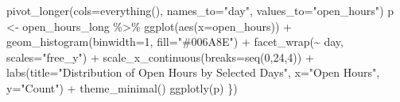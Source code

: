 \documentclass[
  12pt,
  letterpaper,
  DIV=11,
  numbers=noendperiod]{scrartcl}
\newenvironment{Shaded}{\begin{snugshade}}{\end{snugshade}}
\newcommand{\AttributeTok}[1]{\textcolor[rgb]{0.98,0.46,0.51}{#1}}
\newcommand{\DecValTok}[1]{\textcolor[rgb]{0.47,0.72,1.00}{#1}}
\newcommand{\FunctionTok}[1]{\textcolor[rgb]{0.70,0.57,0.94}{#1}}
\newcommand{\NormalTok}[1]{\textcolor[rgb]{0.88,0.89,0.91}{#1}}
\newcommand{\OtherTok}[1]{\textcolor[rgb]{0.70,0.57,0.94}{#1}}
\newcommand{\SpecialCharTok}[1]{\textcolor[rgb]{0.47,0.72,1.00}{#1}}
\newcommand{\StringTok}[1]{\textcolor[rgb]{0.62,0.80,1.00}{#1}}
\begin{document}
\begin{Shaded}
\begin{Highlighting}[]
      \FunctionTok{pivot\_longer}\NormalTok{(}\AttributeTok{cols=}\FunctionTok{everything}\NormalTok{(), }\AttributeTok{names\_to=}\StringTok{"day"}\NormalTok{, }\AttributeTok{values\_to=}\StringTok{"open\_hours"}\NormalTok{)}
\NormalTok{    p }\OtherTok{\textless{}{-}}\NormalTok{ open\_hours\_long }\SpecialCharTok{\%\textgreater{}\%}
      \FunctionTok{ggplot}\NormalTok{(}\FunctionTok{aes}\NormalTok{(}\AttributeTok{x=}\NormalTok{open\_hours)) }\SpecialCharTok{+}
      \FunctionTok{geom\_histogram}\NormalTok{(}\AttributeTok{binwidth=}\DecValTok{1}\NormalTok{, }\AttributeTok{fill=}\StringTok{"\#006A8E"}\NormalTok{) }\SpecialCharTok{+}
      \FunctionTok{facet\_wrap}\NormalTok{(}\SpecialCharTok{\textasciitilde{}}\NormalTok{ day, }\AttributeTok{scales=}\StringTok{"free\_y"}\NormalTok{) }\SpecialCharTok{+}
      \FunctionTok{scale\_x\_continuous}\NormalTok{(}\AttributeTok{breaks=}\FunctionTok{seq}\NormalTok{(}\DecValTok{0}\NormalTok{,}\DecValTok{24}\NormalTok{,}\DecValTok{4}\NormalTok{)) }\SpecialCharTok{+}
      \FunctionTok{labs}\NormalTok{(}\AttributeTok{title=}\StringTok{"Distribution of Open Hours by Selected Days"}\NormalTok{,}
           \AttributeTok{x=}\StringTok{"Open Hours"}\NormalTok{, }\AttributeTok{y=}\StringTok{"Count"}\NormalTok{) }\SpecialCharTok{+}
      \FunctionTok{theme\_minimal}\NormalTok{()}
    \FunctionTok{ggplotly}\NormalTok{(p)}
\NormalTok{  \})}
  

\end{Highlighting}
\end{Shaded}
\end{document}
